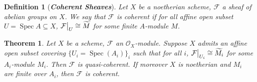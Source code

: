 \documentclass{ctexart}
\newtheorem{definition}{Definition}[section]
\newtheorem{theorem}{Theorem}[section]
\newcommand{\spec}{\operatorname{Spec}}
\begin{document}
\begin{definition}[\textbf{\emph{Coherent Sheaves}}]
    Let $X$ be a noetherian scheme, $\mathcal{F}$ a sheaf of abelian groups on $X$.
    We say that $\mathcal{F}$ is coherent if for all affine open subset $U = \spec A \subseteq X$,
    $\mathcal{F}\big{|}_{U} \cong \widetilde{M}$ for some finite $A$-module $M$.
\end{definition}
\begin{theorem}
    Let $X$ be a scheme, $\mathcal{F}$ an $\mathcal{O}_{X}$-module.
    Suppose $X$ admits an affine open subset covering $\{U_{i} = \spec(A_{i})\}_{i}$ such that for all $i$, $\mathcal{F}\big{|}_{U_{i}} \cong \widetilde{M_{i}}$ for some $A_{i}$-module $M_{i}$.
    Then $\mathcal{F}$ is quasi-coherent.
    If moreover $X$ is noetherian and $M_{i}$ are finite over $A_{i}$, then $\mathcal{F}$ is coherent.
    \label{Theorem 1.1} 
\end{theorem}
\end{document}
